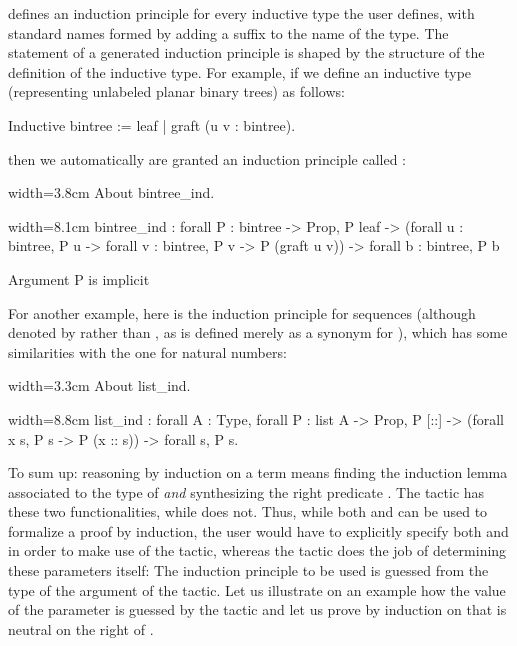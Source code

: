 \Coq{} defines an induction principle for every inductive type the
user defines, with standard names formed by adding a suffix 
to the name of the type. The statement of a generated induction principle
is shaped
by the structure of the definition of the inductive type. For example,
if we define an inductive type  (representing unlabeled planar
binary trees) as follows:
\begin{coq}{}{}
Inductive bintree := leaf | graft (u v : bintree).
\end{coq}
then we automatically are granted an induction principle called
:
\begin{coq}{}{width=3.8cm}
About bintree_ind.
\end{coq}
\begin{coqout}{}{width=8.1cm}
bintree_ind :
forall P : bintree -> Prop,
P leaf ->
(forall u : bintree, P u -> forall v : bintree, P v -> P (graft u v)) ->
forall b : bintree, P b

Argument P is implicit
\end{coqout}

For another example, here is the induction principle for sequences
(although denoted by  rather than , as
 is defined merely as a synonym for ), which has some
similarities with the one for natural numbers:

\begin{coq}{}{width=3.3cm}
About list_ind.
\end{coq}
\begin{coqout}{}{width=8.8cm}
list_ind : forall A : Type, forall P : list A -> Prop,
  P [::] -> (forall x s, P s -> P (x :: s)) -> forall s, P s.
\end{coqout}

To sum up: reasoning by induction on a term  means
finding the induction lemma associated to the type of 
\emph{and} synthesizing
the right predicate .  The  tactic has these two
functionalities, while  does not. Thus, while both 
and  can be used to formalize a proof by induction, the
user would have to explicitly specify both  and  in order to
make use of the  tactic, whereas the  tactic
does the job of determining these parameters itself:
The induction principle
to be used is guessed from the type of the argument of the tactic. Let
us illustrate on an example how the value of the parameter  is
guessed by the  tactic and let us prove by induction on 
that  is neutral on the right of .

